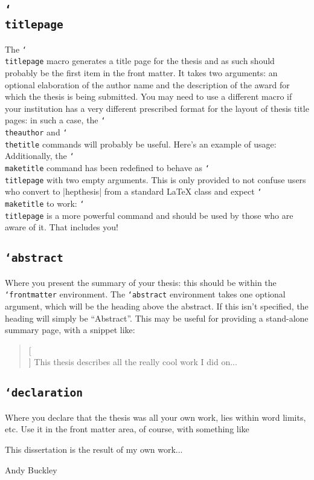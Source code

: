 \documentclass[12pt]{article}
\newcommand{\texcmd}[1]{\texttt{\char`\\#1}}
\newcommand{\texenv}[1]{\texttt{\char`#1}}
\newenvironment{snippet}{\Verbatim}{\endVerbatim}
\begin{document}
\subsection{\texcmd{titlepage}}
The \texcmd{titlepage} macro generates a title page for the thesis and as such
should probably be the first item in the front matter. It takes two arguments:
an optional elaboration of the author name and the description of the award for
which the thesis is being submitted. You may need to use a different macro if
your institution has a very different prescribed format for the layout of thesis
title pages: in such a case, the \texcmd{theauthor} and \texcmd{thetitle}
commands will probably be useful. Here's an example of usage:
%
\begin{snippet}
\end{snippet}
%
Additionally, the \texcmd{maketitle} command has been redefined to behave as
\texcmd{titlepage} with two empty arguments. This is only provided to not
confuse users who convert to |hepthesis| from a standard \LaTeX{} class and
expect \texcmd{maketitle} to work: \texcmd{titlepage} is a more powerful
command and should be used by those who are aware of it. That includes you!

\subsection{\texenv{abstract}}
Where you present the summary of your thesis: this should be within the
\texenv{frontmatter} environment. The \texenv{abstract} environment takes one
optional argument, which will be the heading above the abstract. If this isn't
specified, the heading will simply be ``Abstract''. This may be useful for
providing a stand-alone summary page, with a snippet like:
%
\begin{snippet}
\begin{abstract}%
  [\smaller\thetitle\\ \vspace*{1cm} \smaller{\theauthor}]
\thispagestyle{empty}
This thesis describes all the really cool work I did on...
\end{abstract}
\end{snippet}

\subsection{\texenv{declaration}}
Where you declare that the thesis was all your own work, lies within word
limits, etc. Use it in the front matter area, of course, with something like
%
\begin{snippet}
\begin{declaration}
  This dissertation is the result of my own work...
  \vspace*{1cm}
  \begin{flushright}
    Andy Buckley
  \end{flushright}
\end{declaration}
\end{snippet}
\end{document}
